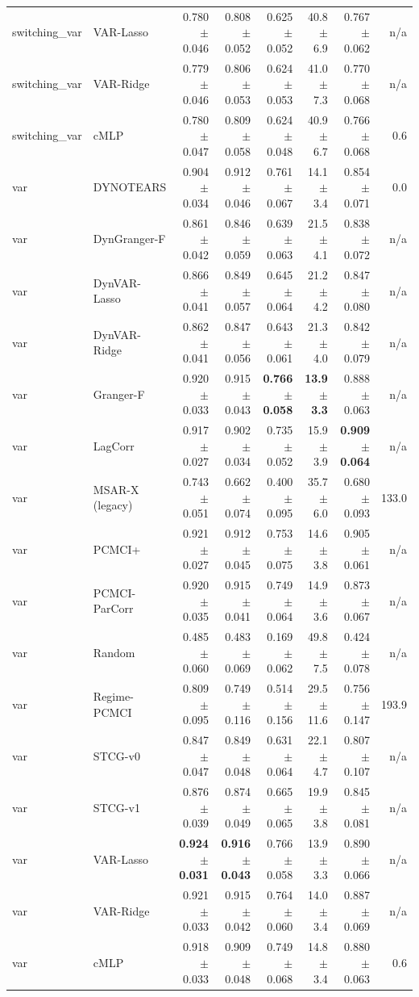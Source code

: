 \begin{tabular}{llrrrrrr}
switching\_var & VAR-Lasso & 0.780 $\pm$ 0.046 & 0.808 $\pm$ 0.052 & 0.625 $\pm$ 0.052 & 40.8 $\pm$ 6.9 & 0.767 $\pm$ 0.062 & n/a \\
switching\_var & VAR-Ridge & 0.779 $\pm$ 0.046 & 0.806 $\pm$ 0.053 & 0.624 $\pm$ 0.053 & 41.0 $\pm$ 7.3 & 0.770 $\pm$ 0.068 & n/a \\
switching\_var & cMLP & 0.780 $\pm$ 0.047 & 0.809 $\pm$ 0.058 & 0.624 $\pm$ 0.048 & 40.9 $\pm$ 6.7 & 0.766 $\pm$ 0.068 & 0.6 \\
\midrule
var & DYNOTEARS & 0.904 $\pm$ 0.034 & 0.912 $\pm$ 0.046 & 0.761 $\pm$ 0.067 & 14.1 $\pm$ 3.4 & 0.854 $\pm$ 0.071 & 0.0 \\
var & DynGranger-F & 0.861 $\pm$ 0.042 & 0.846 $\pm$ 0.059 & 0.639 $\pm$ 0.063 & 21.5 $\pm$ 4.1 & 0.838 $\pm$ 0.072 & n/a \\
var & DynVAR-Lasso & 0.866 $\pm$ 0.041 & 0.849 $\pm$ 0.057 & 0.645 $\pm$ 0.064 & 21.2 $\pm$ 4.2 & 0.847 $\pm$ 0.080 & n/a \\
var & DynVAR-Ridge & 0.862 $\pm$ 0.041 & 0.847 $\pm$ 0.056 & 0.643 $\pm$ 0.061 & 21.3 $\pm$ 4.0 & 0.842 $\pm$ 0.079 & n/a \\
var & Granger-F & 0.920 $\pm$ 0.033 & 0.915 $\pm$ 0.043 & \textbf{0.766 $\pm$ 0.058} & \textbf{13.9 $\pm$ 3.3} & 0.888 $\pm$ 0.063 & n/a \\
var & LagCorr & 0.917 $\pm$ 0.027 & 0.902 $\pm$ 0.034 & 0.735 $\pm$ 0.052 & 15.9 $\pm$ 3.9 & \textbf{0.909 $\pm$ 0.064} & n/a \\
var & MSAR-X (legacy) & 0.743 $\pm$ 0.051 & 0.662 $\pm$ 0.074 & 0.400 $\pm$ 0.095 & 35.7 $\pm$ 6.0 & 0.680 $\pm$ 0.093 & 133.0 \\
var & PCMCI+ & 0.921 $\pm$ 0.027 & 0.912 $\pm$ 0.045 & 0.753 $\pm$ 0.075 & 14.6 $\pm$ 3.8 & 0.905 $\pm$ 0.061 & n/a \\
var & PCMCI-ParCorr & 0.920 $\pm$ 0.035 & 0.915 $\pm$ 0.041 & 0.749 $\pm$ 0.064 & 14.9 $\pm$ 3.6 & 0.873 $\pm$ 0.067 & n/a \\
var & Random & 0.485 $\pm$ 0.060 & 0.483 $\pm$ 0.069 & 0.169 $\pm$ 0.062 & 49.8 $\pm$ 7.5 & 0.424 $\pm$ 0.078 & n/a \\
var & Regime-PCMCI & 0.809 $\pm$ 0.095 & 0.749 $\pm$ 0.116 & 0.514 $\pm$ 0.156 & 29.5 $\pm$ 11.6 & 0.756 $\pm$ 0.147 & 193.9 \\
var & STCG-v0 & 0.847 $\pm$ 0.047 & 0.849 $\pm$ 0.048 & 0.631 $\pm$ 0.064 & 22.1 $\pm$ 4.7 & 0.807 $\pm$ 0.107 & n/a \\
var & STCG-v1 & 0.876 $\pm$ 0.039 & 0.874 $\pm$ 0.049 & 0.665 $\pm$ 0.065 & 19.9 $\pm$ 3.8 & 0.845 $\pm$ 0.081 & n/a \\
var & VAR-Lasso & \textbf{0.924 $\pm$ 0.031} & \textbf{0.916 $\pm$ 0.043} & 0.766 $\pm$ 0.058 & 13.9 $\pm$ 3.3 & 0.890 $\pm$ 0.066 & n/a \\
var & VAR-Ridge & 0.921 $\pm$ 0.033 & 0.915 $\pm$ 0.042 & 0.764 $\pm$ 0.060 & 14.0 $\pm$ 3.4 & 0.887 $\pm$ 0.069 & n/a \\
var & cMLP & 0.918 $\pm$ 0.033 & 0.909 $\pm$ 0.048 & 0.749 $\pm$ 0.068 & 14.8 $\pm$ 3.4 & 0.880 $\pm$ 0.063 & 0.6 \\
\bottomrule
\end{tabular}
